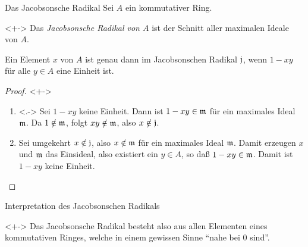 \begin{frame}{Das Jacobsonsche Radikal}
    Sei \(A\) ein kommutativer Ring.
    \begin{definition}<+->
        Das \emph{Jacobsonsche Radikal von \(A\)} ist der Schnitt aller maximalen 
        Ideale von \(A\).
    \end{definition}
    \begin{proposition}
        Ein Element \(x\) von \(A\) ist genau dann im Jacobsonschen Radikal
        \(\mathfrak{j}\), wenn \(1 - xy\) für alle \(y \in A\) eine Einheit ist.
    \end{proposition}
    \begin{proof}<+->
        \begin{enumerate}[<+->]
        \item<.->
            Sei \(1 - xy\) keine Einheit. Dann ist \(1 - xy \in \mathfrak{m}\) für ein
            maximales Ideal \(\mathfrak{m}\). Da \(1 \notin \mathfrak{m}\), folgt
            \(xy \notin \mathfrak{m}\), also \(x \notin \mathfrak{j}\).
        \item
            Sei umgekehrt \(x \notin \mathfrak{j}\), also \(x \notin \mathfrak{m}\) für ein
            maximales Ideal \(\mathfrak{m}\). Damit erzeugen \(x\) und \(\mathfrak{m}\) das
            Einsideal, also existiert ein \(y \in A\), so daß \(1 - xy \in \mathfrak{m}\).
            Damit ist \(1 - xy\) keine Einheit.
            \qedhere
        \end{enumerate}
    \end{proof}
\end{frame}

\begin{frame}{Interpretation des Jacobsonschen Radikals}
    \begin{visibleenv}<+->
        Das Jacobsonsche Radikal besteht also aus allen Elementen eines kommutativen
        Ringes, welche in einem gewissen Sinne "`nahe bei \(0\) sind"'.
    \end{visibleenv}
\end{frame}

